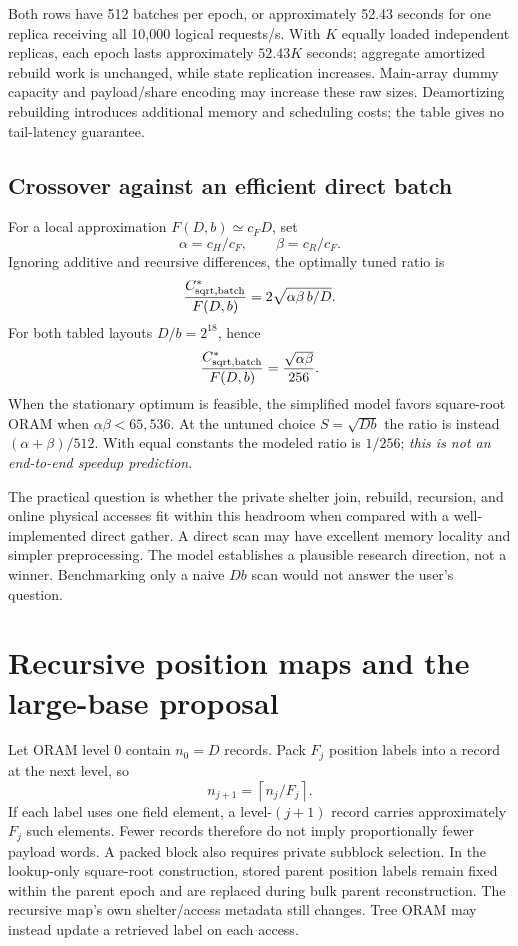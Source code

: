 \documentclass[11pt]{article}
\begin{document}
Both rows have 512 batches per epoch, or approximately 52.43 seconds for one
replica receiving all 10,000 logical requests/s. With $K$ equally loaded
independent replicas, each epoch lasts approximately $52.43K$ seconds; aggregate
amortized rebuild work is unchanged, while state replication increases.
Main-array dummy capacity and payload/share
encoding may increase these raw sizes. Deamortizing rebuilding introduces
additional memory and scheduling costs; the table gives no tail-latency guarantee.

\subsection{Crossover against an efficient direct batch}

For a local approximation $F(D,b)\simeq c_FD$, set
\[
\alpha=c_H/c_F,\qquad \beta=c_R/c_F.
\]
Ignoring additive and recursive differences, the optimally tuned ratio is
\begin{equation}
\frac{C_{\rm sqrt,batch}^*}{F(D,b)}
=2\sqrt{\alpha\beta\,b/D}.
\label{eq:crossover}
\end{equation}
For both tabled layouts $D/b=2^{18}$, hence
\[
\frac{C_{\rm sqrt,batch}^*}{F(D,b)}=\frac{\sqrt{\alpha\beta}}{256}.
\]
When the stationary optimum is feasible, the simplified model favors square-root
ORAM when $\alpha\beta<65{,}536$.
At the untuned choice $S=\sqrt{Db}$ the ratio is instead
$(\alpha+\beta)/512$. With equal constants the modeled ratio is $1/256$;
\emph{this is not an end-to-end speedup prediction}.

The practical question is whether the private shelter join, rebuild, recursion,
and online physical accesses fit within this headroom when compared with a
well-implemented direct gather. A direct scan may have excellent memory
locality and simpler preprocessing. The model establishes a plausible research
direction, not a winner. Benchmarking only a naive $Db$ scan would not answer
the user's question.

\section{Recursive position maps and the large-base proposal}\label{sec:recursion}

Let ORAM level 0 contain $n_0=D$ records. Pack $F_j$ position labels into a record
at the next level, so
\[
n_{j+1}=\left\lceil n_j/F_j\right\rceil.
\]
If each label uses one field element, a level-$(j+1)$ record carries approximately
$F_j$ such elements. Fewer records therefore do not imply proportionally fewer
payload words. A packed block also requires private subblock selection. In the
lookup-only square-root construction, stored parent position labels remain
fixed within the parent epoch and are replaced during bulk parent reconstruction.
The recursive map's own shelter/access metadata still changes. Tree ORAM may
instead update a retrieved label on each access.
\end{document}
